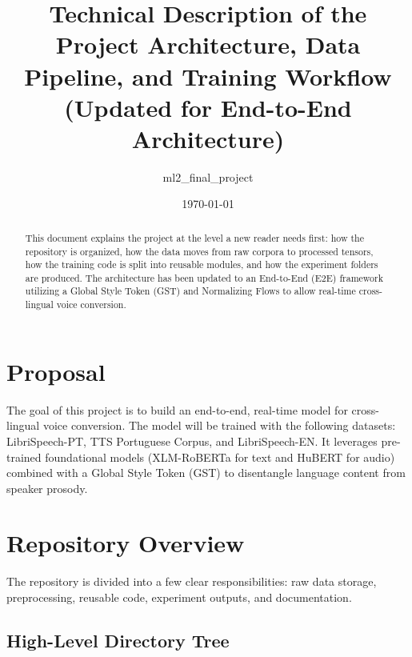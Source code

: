 \documentclass[11pt]{article}
\title{Technical Description of the Project Architecture, Data Pipeline, and Training Workflow\\ \large (Updated for End-to-End Architecture)}
\author{ml2\_final\_project}
\date{\today}
\begin{document}
\maketitle

\begin{abstract}
This document explains the project at the level a new reader needs first: how the repository is organized, how the data moves from raw corpora to processed tensors, how the training code is split into reusable modules, and how the experiment folders are produced. The architecture has been updated to an End-to-End (E2E) framework utilizing a Global Style Token (GST) and Normalizing Flows to allow real-time cross-lingual voice conversion.
\end{abstract}

\tableofcontents
\newpage

\section{Proposal}
The goal of this project is to build an end-to-end, real-time model for cross-lingual voice conversion. The model will be trained with the following datasets: LibriSpeech-PT, TTS Portuguese Corpus, and LibriSpeech-EN. It leverages pre-trained foundational models (XLM-RoBERTa for text and HuBERT for audio) combined with a Global Style Token (GST) to disentangle language content from speaker prosody.

\section{Repository Overview}

The repository is divided into a few clear responsibilities: raw data storage, preprocessing, reusable code, experiment outputs, and documentation.

\subsection{High-Level Directory Tree}
\end{document}
